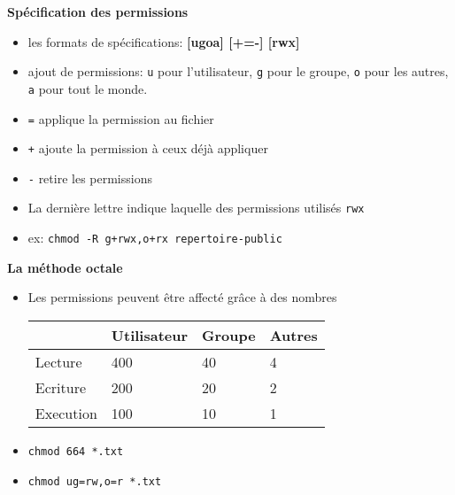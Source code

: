 \documentclass[french]{beamer}
\begin{document}
\begin{frame}
\textbf{Spécification des permissions}
\begin{itemize}
\item les formats de spécifications:
\textbf{[ugoa] [+=-] [rwx]}
\item ajout de permissions: \texttt{u} pour l'utilisateur, \texttt{g} pour le
groupe, \texttt{o} pour les autres, \texttt{a} pour tout le monde.
\item \texttt{=} applique la permission au fichier
\item \texttt{+} ajoute la permission à ceux déjà appliquer
\item \texttt{-} retire les permissions
\item La dernière lettre indique laquelle des permissions utilisés \texttt{rwx}
\item ex: \texttt{chmod -R g+rwx,o+rx repertoire-public}
\end{itemize}
\end{frame}

\begin{frame}
\textbf{La méthode octale}
\begin{itemize}
    \item Les permissions peuvent être affecté grâce à des nombres
    \begin{tabular}{|l|l|l|l|}
       \hline
       & \textbf{Utilisateur} & \textbf{Groupe} & \textbf{Autres} \\
       \hline
       Lecture & 400 & 40 & 4 \\
       Ecriture & 200 & 20 & 2 \\
       Execution & 100 & 10 & 1 \\
       \hline
    \end{tabular}
    \item \texttt{chmod 664 *.txt}
    \item \texttt{chmod ug=rw,o=r *.txt}
    \end{itemize}
\end{frame}
\end{document}
